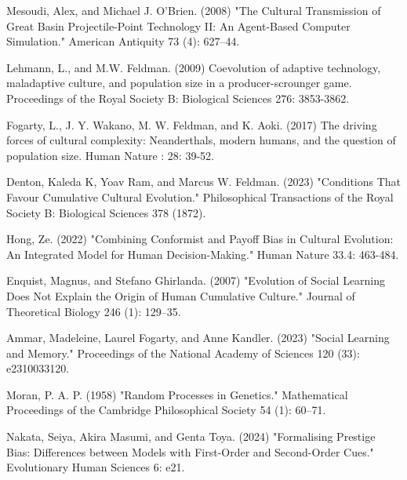 \documentclass[12pt]{extarticle}
\begin{document}
\begin{thebibliography}{}
Mesoudi, Alex, and Michael J. O’Brien. (2008) "The Cultural Transmission of Great Basin Projectile-Point Technology II: An Agent-Based Computer Simulation." American Antiquity 73 (4): 627–44. 

Lehmann, L., and M.W. Feldman. (2009) Coevolution of adaptive technology, maladaptive culture, and population size in a producer-scrounger game. Proceedings of the Royal Society B: Biological Sciences 276: 3853-3862.

Fogarty, L., J. Y. Wakano, M. W. Feldman, and K. Aoki. (2017) The driving forces of cultural complexity: Neanderthals, modern humans, and the question of population size. Human Nature : 28: 39-52.

Denton, Kaleda K, Yoav Ram, and Marcus W. Feldman. (2023) "Conditions That Favour Cumulative Cultural Evolution." Philosophical Transactions of the Royal Society B: Biological Sciences 378 (1872).

Hong, Ze. (2022) "Combining Conformist and Payoff Bias in Cultural Evolution: An Integrated Model for Human Decision-Making." Human Nature 33.4: 463-484.

 Enquist, Magnus, and Stefano Ghirlanda. (2007) "Evolution of Social Learning Does Not Explain the Origin of Human Cumulative Culture." Journal of Theoretical Biology 246 (1): 129–35.

Ammar, Madeleine, Laurel Fogarty, and Anne Kandler. (2023) "Social Learning and Memory." Proceedings of the National Academy of Sciences 120 (33): e2310033120. 

Moran, P. A. P. (1958) "Random Processes in Genetics." Mathematical Proceedings of the Cambridge Philosophical Society 54 (1): 60–71.

Nakata, Seiya, Akira Masumi, and Genta Toya. (2024) "Formalising Prestige Bias: Differences between Models with First-Order and Second-Order Cues." Evolutionary Human Sciences 6: e21.



\end{thebibliography}

\pagebreak
\end{document}
